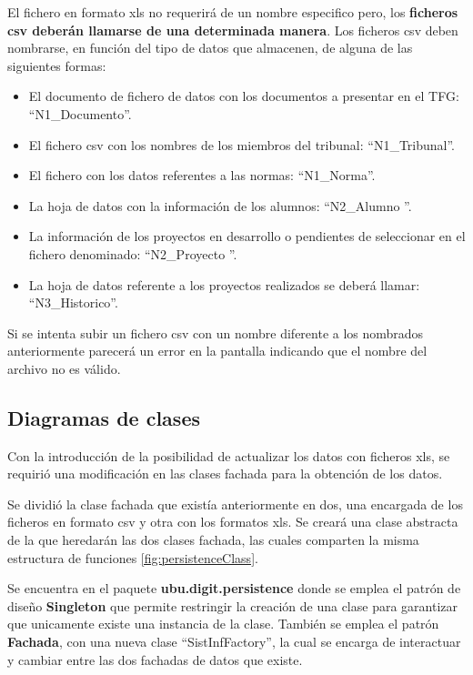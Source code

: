 El fichero en formato xls no requerirá de un nombre especifico pero, los \textbf{ficheros csv deberán llamarse de una determinada manera}. Los ficheros csv deben nombrarse, en función del tipo de datos que almacenen, de alguna de las siguientes formas:
\begin{itemize}
	\item El documento de fichero de datos con los documentos a presentar en el TFG: ``N1\_Documento''.
	\item El fichero csv con los nombres de los miembros del tribunal: ``N1\_Tribunal''.
	\item El fichero con los datos referentes a las normas: ``N1\_Norma''.
	\item La hoja de datos con la información de los alumnos: ``N2\_Alumno ''.
	\item La información de los proyectos en desarrollo o pendientes de seleccionar en el fichero denominado: ``N2\_Proyecto ''.
	\item La hoja de datos referente a los proyectos realizados se deberá llamar: ``N3\_Historico''.
\end{itemize}

Si se intenta subir un fichero csv con un nombre diferente a los nombrados anteriormente parecerá un error en la pantalla indicando que el nombre del archivo no es válido.

\subsection{Diagramas de clases}	
Con la introducción de la posibilidad de actualizar los datos con ficheros xls, se requirió una modificación en las clases fachada para la obtención de los datos. 

Se dividió la clase fachada que existía anteriormente en dos, una encargada de los ficheros en formato csv y otra con los formatos xls. Se creará una clase abstracta de la que heredarán las dos clases fachada, las cuales comparten la misma estructura de funciones \ref{fig:persistenceClass}.

Se encuentra en el paquete \textbf{ubu.digit.persistence} donde se emplea el patrón de diseño \textbf{Singleton} que permite restringir la creación de una clase para garantizar que unicamente existe una instancia de la clase. También se emplea el patrón \textbf{Fachada}, con una nueva clase ``SistInfFactory'', la cual se encarga de interactuar y cambiar entre las dos fachadas de datos que existe.



